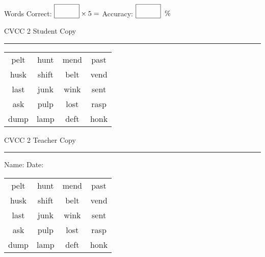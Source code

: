 \documentclass{memoir}
\begin{document}
\small

Words Correct: $\fbox{\phantom{\huge 100}} \times 5 = $ Accuracy: $\fbox{\phantom{\huge 100}}\;\; \%$ 

\vfill

\newpage


\footnotesize \noindent
CVCC 2 \hfill Student Copy
\smallskip
\hrule

\Large

\setlength{\tabcolsep}{14pt}
\def\arraystretch{3}

{\selectfont


\begin{vplace}[0.5]
\begin{center}
\begin{tabular}{cccc}
pelt & hunt & mend & past \\
husk & shift & belt & vend \\
last & junk & wink & sent \\
ask  & pulp & lost & rasp \\
dump & lamp & deft & honk \\
\end{tabular}
\end{center}
\end{vplace}

}

\newpage

\footnotesize \noindent
CVCC 2 \hfill Teacher Copy
\smallskip
\hrule

\small

\vfill

\noindent
Name: \underline{\hspace{1.75in}} \hfill Date: \underline{\hspace{1in}}

\Large

{\selectfont


\begin{vplace}[0.5]
\begin{center}
\begin{tabular}{cccc}
pelt & hunt & mend & past \\
husk & shift & belt & vend \\
last & junk & wink & sent \\
ask  & pulp & lost & rasp \\
dump & lamp & deft & honk \\
\end{tabular}
\end{center}
\end{vplace}



}
\end{document}
